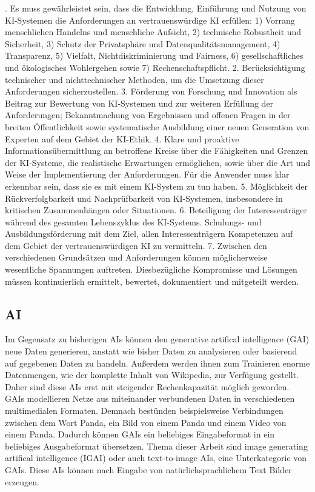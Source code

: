 \documentclass[12pt]{article}
\begin{document}
. Es muss gewährleistet sein, dass die Entwicklung, Einführung und Nutzung von KI-Systemen die Anforderungen an vertrauenswürdige KI erfüllen: 1) Vorrang menschlichen Handelns und menschliche Aufsicht, 2) technische Robustheit und Sicherheit, 3) Schutz der Privatsphäre und Datenqualitätsmanagement, 4) Transparenz, 5) Vielfalt, Nichtdiskriminierung und Fairness, 6) gesellschaftliches und ökologisches Wohlergehen sowie 7) Rechenschaftspflicht. 
2. Berücksichtigung technischer und nichttechnischer Methoden, um die Umsetzung dieser Anforderungen sicherzustellen. 
3. Förderung von Forschung und Innovation als Beitrag zur Bewertung von KI-Systemen und zur weiteren Erfüllung der Anforderungen; Bekanntmachung von Ergebnissen und offenen Fragen in der breiten Öffentlichkeit sowie systematische Ausbildung einer neuen Generation von Experten auf dem Gebiet der KI-Ethik. 
4. Klare und proaktive Informationsübermittlung an betroffene Kreise über die Fähigkeiten und Grenzen der KI-Systeme, die realistische Erwartungen ermöglichen, sowie über die Art und Weise der Implementierung der Anforderungen. Für die Anwender muss klar erkennbar sein, dass sie es mit einem KI-System zu tun haben. 
5. Möglichkeit der Rückverfolgbarkeit und Nachprüfbarkeit von KI-Systemen, insbesondere in kritischen Zusammenhängen oder Situationen. 
6. Beteiligung der Interessenträger während des gesamten Lebenszyklus des KI-Systems. Schulungs- und Ausbildungsförderung mit dem Ziel, allen Interessenträgern Kompetenzen auf dem Gebiet der vertrauenswürdigen KI zu vermitteln. 
7. Zwischen den verschiedenen Grundsätzen und Anforderungen können möglicherweise wesentliche Spannungen auftreten. Diesbezügliche Kompromisse und Lösungen müssen kontinuierlich ermittelt, bewertet, dokumentiert und mitgeteilt werden.\grqq{}


\subsection{AI}
Im Gegensatz zu bisherigen AIs können den generative artifical intelligence (GAI) neue Daten generieren, anstatt wie bisher Daten zu analysieren oder basierend auf gegebenen Daten zu handeln. Außerdem werden ihnen zum Trainieren enorme Datenmengen, 
wie der komplette Inhalt von Wikipedia, zur Verfügung gestellt. Daher sind diese AIs erst mit steigender Rechenkapazität möglich geworden. GAIs modellieren Netze aus miteinander verbundenen Daten in verschiedenen multimedialen Formaten. Demnach 
bestünden beispielsweise Verbindungen zwischen dem Wort Panda, ein Bild von einem Panda und einem Video von einem Panda. Dadurch können GAIs ein beliebiges Eingabeformat in ein beliebiges Ausgabeformat übersetzen. Thema dieser Arbeit sind image generating 
artifical intelligence (IGAI) oder auch text-to-image AIs, eine Unterkategorie von GAIs. Diese AIs können nach Eingabe von natürlichsprachlichem Text Bilder erzeugen.
\end{document}
